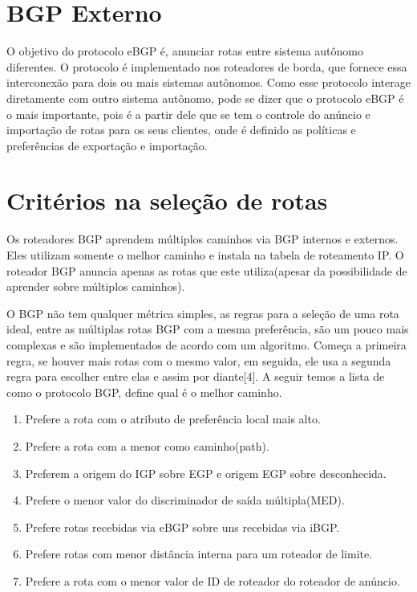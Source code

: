\documentclass[12pt,a4paper]{report}
\begin{document}
\section{BGP Externo}
O objetivo do protocolo eBGP \'e, anunciar rotas entre sistema aut\^onomo diferentes. O protocolo \'e implementado nos roteadores de borda, que fornece essa interconex\~ao para dois ou mais sistemas aut\^onomos. Como esse protocolo interage diretamente com outro sistema aut\^onomo, pode se dizer que o protocolo eBGP \'e o mais importante, pois \'e a partir dele que se tem o controle do an\'uncio e importa\c{c}\~ao de rotas para os seus clientes, onde \'e definido as pol\'iticas e prefer\^encias de exporta\c{c}\~ao e importa\c{c}\~ao.

\section{Crit\'erios na sele\c{c}\~ao de rotas}
Os roteadores BGP aprendem m\'ultiplos caminhos via BGP internos e externos.  Eles utilizam somente o melhor caminho e instala na tabela de roteamento IP. O roteador BGP anuncia apenas as rotas que este utiliza(apesar da possibilidade de aprender sobre múltiplos caminhos).

O BGP n\~ao tem qualquer m\'etrica simples, as regras para a sele\c{c}\~ao de uma rota ideal, entre as m\'ultiplas rotas BGP com a mesma prefer\^encia, s\~ao um pouco mais complexas e s\~ao implementados de acordo com um algoritmo. Come\c{c}a a primeira regra, se houver mais rotas com o mesmo valor, em seguida, ele usa a segunda regra para escolher entre elas e assim por diante[4]. A seguir temos a lista de como o protocolo BGP, define qual \'e o melhor caminho.

\begin{enumerate}
\item Prefere a rota com o atributo de prefer\^encia local mais alto.
\item Prefere a rota com a menor como caminho(path).
\item Preferem a origem do IGP sobre EGP e origem EGP sobre desconhecida.
\item Prefere o menor valor do discriminador de sa\'ida m\'ultipla(MED).
\item Prefere rotas recebidas via eBGP sobre uns recebidas via iBGP.
\item Prefere rotas com menor dist\^ancia interna para um roteador de limite.
\item Prefere a rota com o menor valor de ID de roteador do roteador de an\'uncio.
\end{enumerate}
\end{document}
